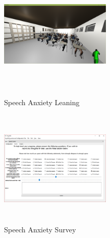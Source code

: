\documentclass[a4paper,10pt]{article}
\begin{document}
\begin{figure}[H]
	\centering
	\begin{minipage}{0.45\textwidth}
		\centering
		\includegraphics[width=200px, height=210px, keepaspectratio]{speechSS2.png}
		\caption{Speech Anxiety Leaning}
		\label{fig:speechSS2}
	\end{minipage}\hfill
	\begin{minipage}{0.45\textwidth}
		\centering
		\includegraphics[width=200px, height=210px, keepaspectratio]{qtSpeechSurvey.png}
		\caption{Speech Anxiety Survey}
		\label{fig:qtSpeechSurvey}
	\end{minipage}
\end{figure}
\end{document}
